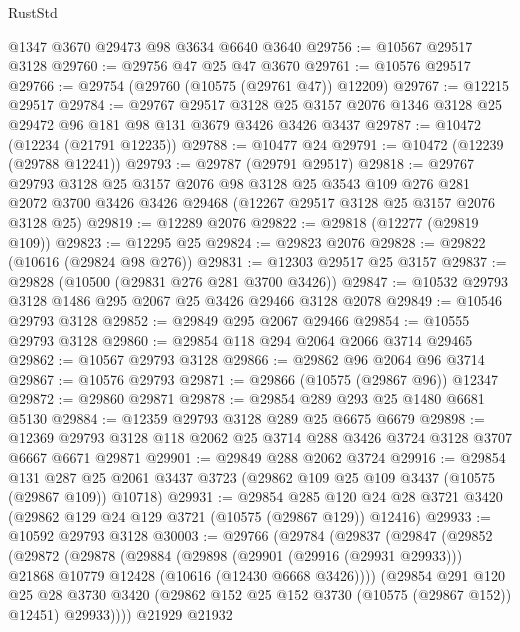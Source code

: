 \begin{lexlean}{RustStd}
\begin{coremodule}
    @1347
    @3670
    @29473
    @98
    @3634
    @6640
    @3640
@29756 := @10567 @29517 @3128
@29760 := @29756 @47 @25 @47 @3670
@29761 := @10576 @29517
@29766 := @29754 (@29760 (@10575 (@29761 @47)) @12209)
@29767 := @12215 @29517
@29784 := @29767
    @29517
    @3128
    @25
    @3157
    @2076
    @1346
    @3128
    @25
    @29472
    @96
    @181
    @98
    @131
    @3679
    @3426
    @3426
    @3437
@29787 := @10472 (@12234 (@21791 @12235))
@29788 := @10477 @24
@29791 := @10472 (@12239 (@29788 @12241))
@29793 := @29787 (@29791 @29517)
@29818 := @29767
    @29793
    @3128
    @25
    @3157
    @2076
    @98
    @3128
    @25
    @3543
    @109
    @276
    @281
    @2072
    @3700
    @3426
    @3426
    @29468
    (@12267 @29517 @3128 @25 @3157 @2076 @3128 @25)
@29819 := @12289 @2076
@29822 := @29818 (@12277 (@29819 @109))
@29823 := @12295 @25
@29824 := @29823 @2076
@29828 := @29822 (@10616 (@29824 @98 @276))
@29831 := @12303 @29517 @25 @3157
@29837 := @29828 (@10500 (@29831 @276 @281 @3700 @3426))
@29847 := @10532 @29793 @3128 @1486 @295 @2067 @25 @3426 @29466 @3128 @2078
@29849 := @10546 @29793 @3128
@29852 := @29849 @295 @2067 @29466
@29854 := @10555 @29793 @3128
@29860 := @29854 @118 @294 @2064 @2066 @3714 @29465
@29862 := @10567 @29793 @3128
@29866 := @29862 @96 @2064 @96 @3714
@29867 := @10576 @29793
@29871 := @29866 (@10575 (@29867 @96)) @12347
@29872 := @29860 @29871
@29878 := @29854 @289 @293 @25 @1480 @6681 @5130
@29884 := @12359 @29793 @3128 @289 @25 @6675 @6679
@29898 := @12369 @29793 @3128 @118 @2062 @25 @3714 @288 @3426 @3724 @3128 @3707 @6667 @6671 @29871
@29901 := @29849 @288 @2062 @3724
@29916 := @29854
    @131
    @287
    @25
    @2061
    @3437
    @3723
    (@29862 @109 @25 @109 @3437 (@10575 (@29867 @109)) @10718)
@29931 := @29854
    @285
    @120
    @24
    @28
    @3721
    @3420
    (@29862 @129 @24 @129 @3721 (@10575 (@29867 @129)) @12416)
@29933 := @10592 @29793 @3128
@30003 := @29766
    (@29784
      (@29837
        (@29847
          (@29852
            (@29872
              (@29878
                (@29884
                  (@29898
                    (@29901 (@29916 (@29931 @29933)))
                    @21868
                    @10779
                    @12428
                    (@10616 (@12430 @6668 @3426))))
                (@29854
                  @291
                  @120
                  @25
                  @28
                  @3730
                  @3420
                  (@29862 @152 @25 @152 @3730 (@10575 (@29867 @152)) @12451)
                  @29933))))
          @21929
          @21932

\end{coremodule}
\end{lexlean}
